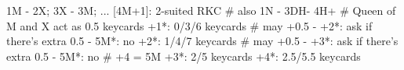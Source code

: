 1M - 2X; 3X - 3M; ... [4M+1]: 2-suited RKC
# also 1N - 3DH- 4H+
# Queen of M and X act as 0.5 keycards
+1*: 0/3/6 keycards  # may +0.5
   - +2*: ask if there's extra 0.5
        - 5M*: no
+2*: 1/4/7 keycards  # may +0.5
   - +3*: ask if there's extra 0.5
        - 5M*: no  # +4 = 5M
+3*: 2/5 keycards
+4*: 2.5/5.5 keycards